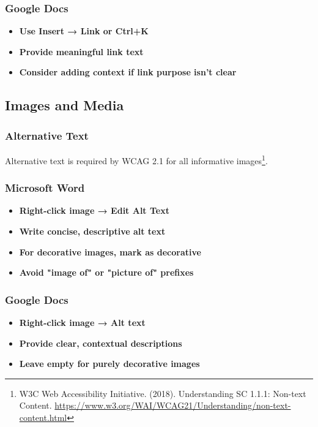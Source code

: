 \subsubsection{Google Docs}
\vspace{1em}
\begin{itemize}
\item \textbf{Use Insert → Link or Ctrl+K}
\item \textbf{Provide meaningful link text}
\item \textbf{Consider adding context if link purpose isn't clear}
\end{itemize}
\vspace{1em}

\subsection{Images and Media}

\subsubsection{Alternative Text}
Alternative text is required by WCAG 2.1 for all informative images\footnote{W3C Web Accessibility Initiative. (2018). Understanding SC 1.1.1: Non-text Content. \url{https://www.w3.org/WAI/WCAG21/Understanding/non-text-content.html}}.

\subsubsection{Microsoft Word}
\vspace{1em}
\begin{itemize}
\item \textbf{Right-click image → Edit Alt Text}
\item \textbf{Write concise, descriptive alt text}
\item \textbf{For decorative images, mark as decorative}
\item \textbf{Avoid "image of" or "picture of" prefixes}
\end{itemize}
\vspace{1em}

\subsubsection{Google Docs}
\vspace{1em}
\begin{itemize}
\item \textbf{Right-click image → Alt text}
\item \textbf{Provide clear, contextual descriptions}
\item \textbf{Leave empty for purely decorative images}
\end{itemize}
\vspace{1em}

